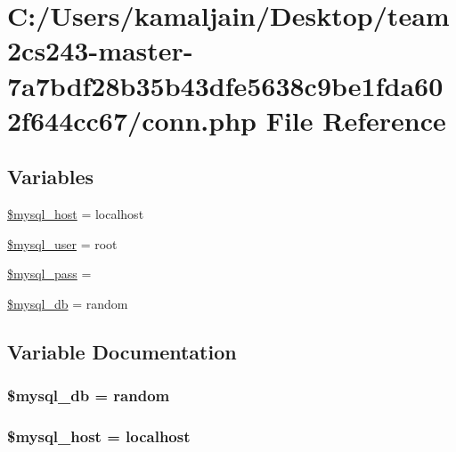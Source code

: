 \hypertarget{conn_8php}{}\section{C\+:/\+Users/kamaljain/\+Desktop/team2cs243-\/master-\/7a7bdf28b35b43dfe5638c9be1fda602f644cc67/conn.php File Reference}
\label{conn_8php}
\subsection*{Variables}
\begin{DoxyCompactItemize}
\item 
\hyperlink{conn_8php_a634270c8d498dd3b7ae1be23a6d2e0b5}{\$mysql\+\_\+host} = \textquotesingle{}localhost\textquotesingle{}
\item 
\hyperlink{conn_8php_aa5ff88366cd1d94ee80c60a25c1a726c}{\$mysql\+\_\+user} = \textquotesingle{}root\textquotesingle{}
\item 
\hyperlink{conn_8php_a3cc7a590eaed38abba7a752eca7158e0}{\$mysql\+\_\+pass} = \textquotesingle{}\textquotesingle{}
\item 
\hyperlink{conn_8php_a158e8d3838661fcab4fd43e7918c6e76}{\$mysql\+\_\+db} = \textquotesingle{}random\textquotesingle{}
\end{DoxyCompactItemize}


\subsection{Variable Documentation}
\subsubsection[{\texorpdfstring{\$mysql\+\_\+db}{$mysql_db}}]{\setlength{\rightskip}{0pt plus 5cm}\$mysql\+\_\+db = \textquotesingle{}random\textquotesingle{}}\hypertarget{conn_8php_a158e8d3838661fcab4fd43e7918c6e76}{}\label{conn_8php_a158e8d3838661fcab4fd43e7918c6e76}
\subsubsection[{\texorpdfstring{\$mysql\+\_\+host}{$mysql_host}}]{\setlength{\rightskip}{0pt plus 5cm}\$mysql\+\_\+host = \textquotesingle{}localhost\textquotesingle{}}\hypertarget{conn_8php_a634270c8d498dd3b7ae1be23a6d2e0b5}{}\label{conn_8php_a634270c8d498dd3b7ae1be23a6d2e0b5}

